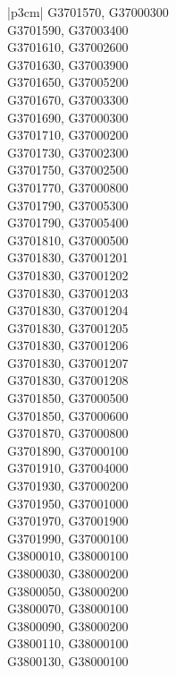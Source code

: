 \begin{customLongTable}{ |p{3cm}| }
G3701570, G37000300 \\ \hline
G3701590, G37003400 \\ \hline
G3701610, G37002600 \\ \hline
G3701630, G37003900 \\ \hline
G3701650, G37005200 \\ \hline
G3701670, G37003300 \\ \hline
G3701690, G37000300 \\ \hline
G3701710, G37000200 \\ \hline
G3701730, G37002300 \\ \hline
G3701750, G37002500 \\ \hline
G3701770, G37000800 \\ \hline
G3701790, G37005300 \\ \hline
G3701790, G37005400 \\ \hline
G3701810, G37000500 \\ \hline
G3701830, G37001201 \\ \hline
G3701830, G37001202 \\ \hline
G3701830, G37001203 \\ \hline
G3701830, G37001204 \\ \hline
G3701830, G37001205 \\ \hline
G3701830, G37001206 \\ \hline
G3701830, G37001207 \\ \hline
G3701830, G37001208 \\ \hline
G3701850, G37000500 \\ \hline
G3701850, G37000600 \\ \hline
G3701870, G37000800 \\ \hline
G3701890, G37000100 \\ \hline
G3701910, G37004000 \\ \hline
G3701930, G37000200 \\ \hline
G3701950, G37001000 \\ \hline
G3701970, G37001900 \\ \hline
G3701990, G37000100 \\ \hline
G3800010, G38000100 \\ \hline
G3800030, G38000200 \\ \hline
G3800050, G38000200 \\ \hline
G3800070, G38000100 \\ \hline
G3800090, G38000200 \\ \hline
G3800110, G38000100 \\ \hline
G3800130, G38000100 \\ \hline

\end{customLongTable}
